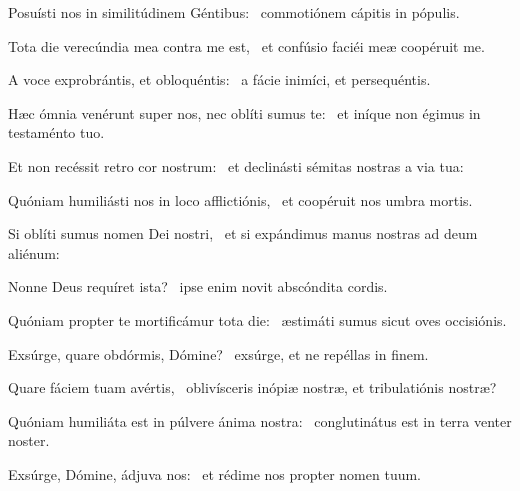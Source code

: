 \item Posuísti nos in similitúdinem Géntibus:~\psstar{} commotiónem cápitis in pópulis.

\item Tota die verecúndia mea contra me est,~\psstar{} et confúsio faciéi meæ coopéruit me.

\item A voce exprobrántis, et obloquéntis:~\psstar{} a fácie inimíci, et persequéntis.

\item Hæc ómnia venérunt super nos, nec oblíti sumus te:~\psstar{} et iníque non égimus in testaménto tuo.

\item Et non recéssit retro cor nostrum:~\psstar{} et declinásti sémitas nostras a via tua:

\item Quóniam humiliásti nos in loco afflictiónis,~\psstar{} et coopéruit nos umbra mortis.

\item Si oblíti sumus nomen Dei nostri,~\psstar{} et si expándimus manus nostras ad deum aliénum:

\item Nonne Deus requíret ista?~\psstar{} ipse enim novit abscóndita cordis.

\item Quóniam propter te mortificámur tota die:~\psstar{} æstimáti sumus sicut oves occisiónis.

\item Exsúrge, quare obdórmis, Dómine?~\psstar{} exsúrge, et ne repéllas in finem.

\item Quare fáciem tuam avértis,~\psstar{} oblivísceris inópiæ nostræ, et tribulatiónis nostræ?

\item Quóniam humiliáta est in púlvere ánima nostra:~\psstar{} conglutinátus est in terra venter noster.

\item Exsúrge, Dómine, ádjuva nos:~\psstar{} et rédime nos propter nomen tuum.